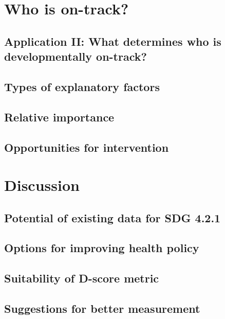\documentclass[]{book}
\theoremstyle{definition}
\theoremstyle{definition}
\theoremstyle{definition}
\theoremstyle{remark}
\begin{document}
\chapter{Who is on-track?}\label{ch:ontrack}

\section{Application II: What determines who is developmentally
on-track?}\label{application-ii-what-determines-who-is-developmentally-on-track}

\section{Types of explanatory
factors}\label{types-of-explanatory-factors}

\section{Relative importance}\label{relative-importance}

\section{Opportunities for
intervention}\label{opportunities-for-intervention}

\chapter{Discussion}\label{ch:discussion2}

\section{Potential of existing data for SDG
4.2.1}\label{potential-of-existing-data-for-sdg-4.2.1}

\section{Options for improving health
policy}\label{options-for-improving-health-policy}

\section{Suitability of D-score
metric}\label{suitability-of-d-score-metric}

\section{Suggestions for better
measurement}\label{suggestions-for-better-measurement}


\end{document}
